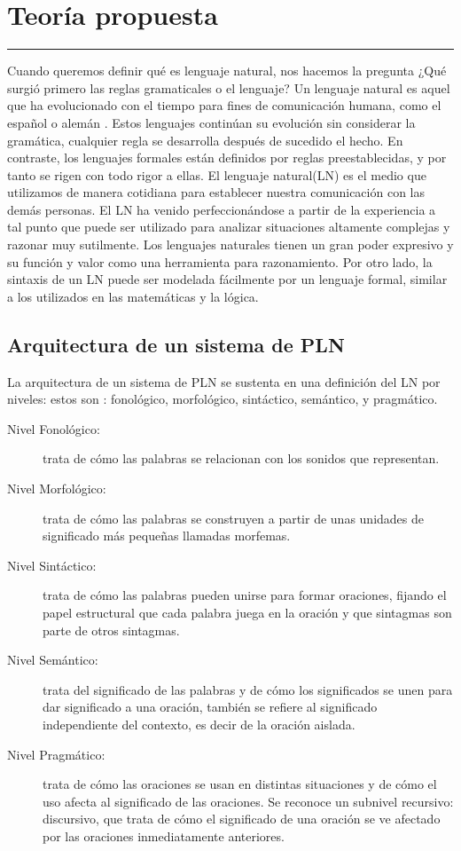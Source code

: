 \chapter{Teoría propuesta}
\hrule \bigskip \vspace*{1cm}
Cuando queremos definir qué es lenguaje natural, nos hacemos la pregunta ¿Qué surgió primero las reglas gramaticales o el lenguaje? Un lenguaje natural es aquel que ha evolucionado con el tiempo para fines de comunicación humana, como el español o alemán \cite{BROOKSHEAR}.
Estos lenguajes continúan su evolución sin considerar la gramática, cualquier regla se desarrolla después de sucedido el hecho. En contraste, los lenguajes formales están definidos por reglas preestablecidas, y por tanto se rigen con todo rigor a ellas. El lenguaje natural(LN) es el medio que utilizamos de manera cotidiana para establecer nuestra comunicación con las demás personas. El LN ha venido perfeccionándose a partir de la experiencia a tal punto que  puede ser utilizado para analizar situaciones altamente
complejas y razonar muy sutilmente. Los lenguajes naturales tienen un gran poder expresivo y su función y valor como una herramienta para razonamiento. Por otro lado, la sintaxis de un LN puede ser modelada fácilmente por un lenguaje formal, similar a los utilizados en las matemáticas y la lógica.

\section{Arquitectura de un sistema de PLN}

La arquitectura de un sistema de PLN se sustenta en
una definición del LN por niveles: estos son : fonológico, morfológico, sintáctico, semántico, y pragmático.

\begin{description}
\item[Nivel Fonológico:] trata de cómo las palabras se relacionan con los sonidos que representan.
\item[Nivel Morfológico:]  trata de cómo las palabras se construyen a partir de unas unidades de significado más pequeñas llamadas morfemas.
\item[Nivel Sintáctico: ] trata de cómo las palabras pueden unirse para formar  oraciones, fijando el papel estructural que cada palabra juega en la oración y que sintagmas son parte de otros sintagmas.
\item[ Nivel Semántico:] trata del significado de las palabras y de cómo los  significados se unen para dar significado a una oración, también se refiere al  significado independiente del contexto, es decir de la oración aislada.
\item[Nivel Pragmático:]  trata de cómo las oraciones se usan en distintas situaciones y de cómo el uso afecta al significado de las oraciones. Se reconoce un subnivel recursivo: discursivo, que trata de cómo el significado de una oración se ve afectado por las oraciones inmediatamente anteriores.
\end{description}

